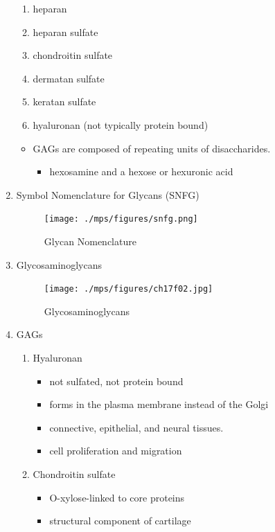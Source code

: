 \documentclass{scrartcl}
\begin{document}
\begin{enumerate}
\begin{enumerate}
\item heparan
\item heparan sulfate
\item chondroitin sulfate
\item dermatan sulfate
\item keratan sulfate
\item hyaluronan (not typically protein bound)
\end{enumerate}


\begin{itemize}
\item GAGs are composed of repeating units of disaccharides.
\begin{itemize}
\item hexosamine and a hexose or hexuronic acid
\end{itemize}
\end{itemize}

\item Symbol Nomenclature for Glycans (SNFG)
\label{sec:orgdf0bf03}

\begin{figure}[htbp]
\centering
\texttt{[image: ./mps/figures/snfg.png]}
\caption[Glycan Nomenclature]{\label{fig:orgbb96a01}
Glycan Nomenclature}
\end{figure}


\item Glycosaminoglycans
\label{sec:orgc34946e}

\begin{figure}[htbp]
\centering
\texttt{[image: ./mps/figures/ch17f02.jpg]}
\caption[Glycosaminoglycans]{\label{fig:orgd83b016}
Glycosaminoglycans}
\end{figure}

\item GAGs
\label{sec:org4373ec0}

\begin{enumerate}
\item Hyaluronan
\label{sec:org17134ed}
\begin{itemize}
\item not sulfated, not protein bound
\item forms in the plasma membrane instead of the Golgi
\item connective, epithelial, and neural tissues.
\item cell proliferation and migration
\end{itemize}

\item Chondroitin sulfate
\label{sec:org8d8830f}
\begin{itemize}
\item O-xylose-linked to core proteins
\item structural component of cartilage
\end{itemize}


\end{enumerate}
\end{enumerate}
\end{document}
